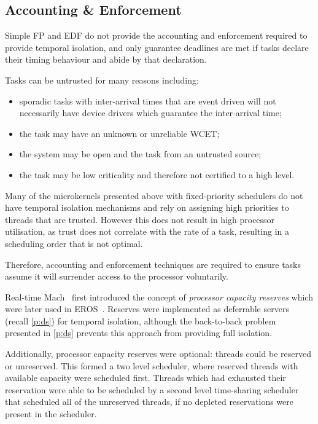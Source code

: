 \subsection{Accounting \& Enforcement}

Simple \gls{FP} and \gls{EDF} do not provide the accounting and enforcement required to provide 
temporal isolation, and only guarantee deadlines are met if tasks declare their timing behaviour
and abide by that declaration. 

Tasks can be untrusted for many reasons including:
\begin{itemize}
    \item sporadic tasks with inter-arrival times that are event driven will not necessarily have
        device drivers which guarantee the inter-arrival time;
    \item the task may have an unknown or unreliable \gls{WCET};
    \item the system may be open and the task from an untrusted source;
    \item the task may be low criticality and therefore not certified to a high level.
\end{itemize}

Many of the microkernels presented above with fixed-priority schedulers
do not have temporal isolation mechanisms and rely on 
assigning high priorities to threads that are trusted. However this does not result in high 
processor utilisation, as trust does not correlate with the rate of a task, resulting in a
scheduling order that is not optimal. 

Therefore, accounting and enforcement techniques are required to ensure tasks 
assume it will surrender access to the processor voluntarily.

Real-time Mach~\citep{Mercer_RZ_94, Mercer_ST_93} first introduced the concept of
\emph{processor capacity reserves} which were later used in EROS~\citep{Shapiro_SF_99}. 
Reserves were implemented as deferrable servers (recall \cref{p:ds}) for temporal isolation, 
although the back-to-back problem presented in \cref{p:ds} prevents this approach from providing
full isolation.

Additionally, processor capacity reserves were optional: threads could be reserved or unreserved. 
This formed a two level scheduler, where reserved threads with available capacity were scheduled
first. Threads which had exhausted their reservation were able to be scheduled by a second level
time-sharing scheduler that scheduled all of the unreserved threads, if no depleted reservations
were present in the scheduler.  

